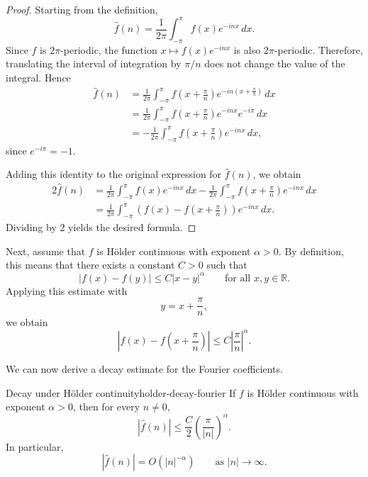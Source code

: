 \begin{proof}
    Starting from the definition,
    \begin{equation}
        \hat{f}(n)=\frac{1}{2\pi}\int_{-\pi}^{\pi} f(x)e^{-inx}\,dx.
    \end{equation}
    Since \(f\) is \(2\pi\)-periodic, the function \(x \mapsto f(x)e^{-inx}\) is also \(2\pi\)-periodic. Therefore, translating the interval of integration by \(\pi/n\) does not change the value of the integral. Hence
    \begin{align*}
        \hat{f}(n)
         & = \frac{1}{2\pi}\int_{-\pi}^{\pi} f\left(x+\frac{\pi}{n}\right)e^{-in\left(x+\frac{\pi}{n}\right)}\,dx \\
         & = \frac{1}{2\pi}\int_{-\pi}^{\pi} f\left(x+\frac{\pi}{n}\right)e^{-inx}e^{-i\pi}\,dx                   \\
         & = -\frac{1}{2\pi}\int_{-\pi}^{\pi} f\left(x+\frac{\pi}{n}\right)e^{-inx}\,dx,
    \end{align*}
    since \(e^{-i\pi}=-1\).

    Adding this identity to the original expression for \(\hat{f}(n)\), we obtain
    \begin{align*}
        2\hat{f}(n)
         & = \frac{1}{2\pi}\int_{-\pi}^{\pi} f(x)e^{-inx}\,dx
        - \frac{1}{2\pi}\int_{-\pi}^{\pi} f\left(x+\frac{\pi}{n}\right)e^{-inx}\,dx \\
         & = \frac{1}{2\pi}\int_{-\pi}^{\pi}
        \left(f(x)-f\left(x+\frac{\pi}{n}\right)\right)e^{-inx}\,dx.
    \end{align*}
    Dividing by \(2\) yields the desired formula.
\end{proof}

Next, assume that \(f\) is Hölder continuous with exponent \(\alpha>0\). By definition, this means that there exists a constant \(C>0\) such that
\begin{equation}
    |f(x)-f(y)| \leq C|x-y|^\alpha
    \qquad \text{for all } x,y\in\mathbb{R}.
\end{equation}
Applying this estimate with
\[
    y=x+\frac{\pi}{n},
\]
we obtain
\begin{equation}
    \left|f(x)-f\left(x+\frac{\pi}{n}\right)\right|
    \leq C\left|\frac{\pi}{n}\right|^\alpha.
\end{equation}

We can now derive a decay estimate for the Fourier coefficients.

\begin{proposition}{Decay under Hölder continuity}{holder-decay-fourier}
    If \(f\) is Hölder continuous with exponent \(\alpha>0\), then for every \(n\neq 0\),
    \begin{equation}
        |\hat{f}(n)| \leq \frac{C}{2}\left(\frac{\pi}{|n|}\right)^\alpha.
    \end{equation}
    In particular,
    \begin{equation}
        |\hat{f}(n)| = O\!\left(|n|^{-\alpha}\right)
        \qquad \text{as } |n|\to\infty.
    \end{equation}
\end{proposition}

